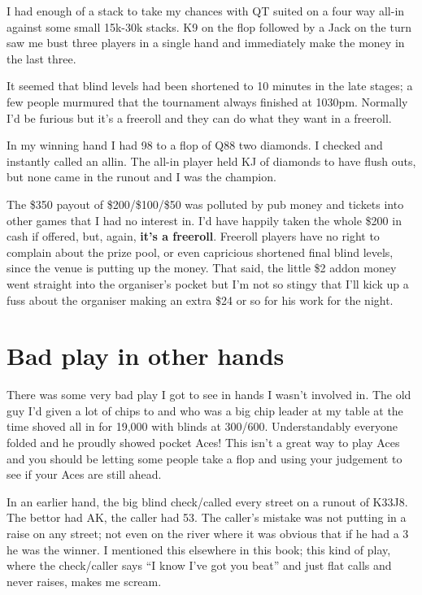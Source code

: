 I had enough of a stack to take my chances with QT suited on a
four way all-in against some small 15k-30k stacks. K9 on the flop
followed by a Jack on the turn saw me bust three players in
a single hand and immediately make the money in the last three.

It seemed that blind levels had been shortened to 10 minutes in
the late stages; a few people murmured that the tournament
always finished at 1030pm. Normally I'd be furious but it's
a freeroll and they can do what they want in a freeroll.

In my winning hand I had 98 to a flop of Q88 two diamonds.
I checked and instantly called an allin. The all-in player held
KJ of diamonds to have flush outs, but none came in the runout
and I was the champion.

The \$350 payout of \$200/\$100/\$50 was polluted by
pub money and tickets into other games that I had no
interest in. I'd have happily taken the whole
\$200 in cash if offered, but, again, \textbf{it's a freeroll}.
Freeroll players have no right to complain about the prize pool,
or even capricious shortened final blind levels, since the
venue is putting up the money. That said, the little \$2 addon
money went straight into the organiser's pocket but I'm not
so stingy that I'll kick up a fuss about the organiser making an extra \$24
or so for his work for the night.

\section{Bad play in other hands}

There was some very bad play I got to see in hands I wasn't involved in.
The old guy I'd given a lot of chips to and who was a big chip leader
at my table at the time shoved all in for 19,000 with blinds at 300/600.
Understandably everyone folded and he proudly showed pocket Aces! This
isn't a great way to play Aces and you should be letting some people
take a flop and using your judgement to see if your Aces are still ahead.

In an earlier hand, the big blind check/called every street on a runout
of K33J8. The bettor had AK, the caller had 53. The caller's mistake was
not putting in a raise on any street; not even on the river where it
was obvious that if he had a 3 he was the winner. I mentioned this
elsewhere in this book; this kind of play, where the check/caller says
``I know I've got you beat'' and just flat calls and never raises,
makes me scream.

